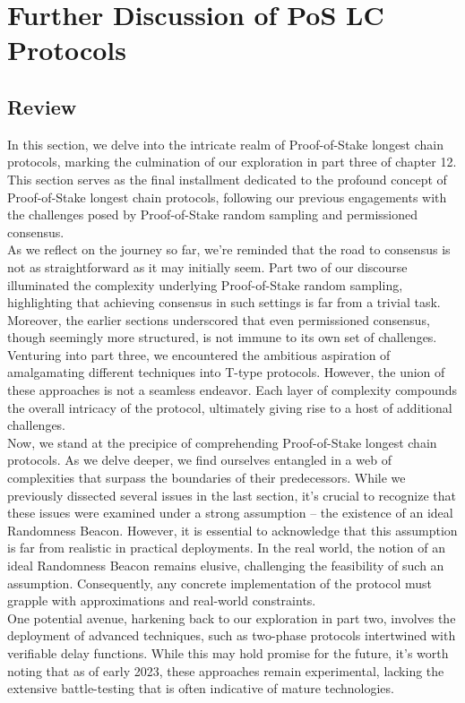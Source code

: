 \section{Further Discussion of PoS LC Protocols}
\subsection{Review}
In this section, we delve into the intricate realm of Proof-of-Stake longest chain protocols, marking the culmination of our exploration in part three of chapter 12. This section serves as the final installment dedicated to the profound concept of Proof-of-Stake longest chain protocols, following our previous engagements with the challenges posed by Proof-of-Stake random sampling and permissioned consensus.\\
As we reflect on the journey so far, we're reminded that the road to consensus is not as straightforward as it may initially seem. Part two of our discourse illuminated the complexity underlying Proof-of-Stake random sampling, highlighting that achieving consensus in such settings is far from a trivial task. Moreover, the earlier sections underscored that even permissioned consensus, though seemingly more structured, is not immune to its own set of challenges.\\
Venturing into part three, we encountered the ambitious aspiration of amalgamating different techniques into T-type protocols. However, the union of these approaches is not a seamless endeavor. Each layer of complexity compounds the overall intricacy of the protocol, ultimately giving rise to a host of additional challenges.\\
Now, we stand at the precipice of comprehending Proof-of-Stake longest chain protocols. As we delve deeper, we find ourselves entangled in a web of complexities that surpass the boundaries of their predecessors. While we previously dissected several issues in the last section, it's crucial to recognize that these issues were examined under a strong assumption – the existence of an ideal Randomness Beacon. However, it is essential to acknowledge that this assumption is far from realistic in practical deployments. In the real world, the notion of an ideal Randomness Beacon remains elusive, challenging the feasibility of such an assumption. Consequently, any concrete implementation of the protocol must grapple with approximations and real-world constraints.\\
One potential avenue, harkening back to our exploration in part two, involves the deployment of advanced techniques, such as two-phase protocols intertwined with verifiable delay functions. While this may hold promise for the future, it's worth noting that as of early 2023, these approaches remain experimental, lacking the extensive battle-testing that is often indicative of mature technologies.
